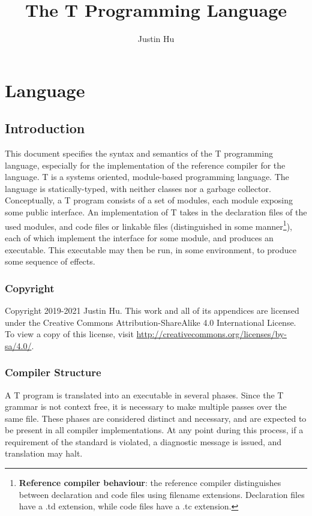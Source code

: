 \documentclass[letterpaper,12pt]{book}
\begin{document}
\title{The T Programming Language}
\author{Justin Hu}
\maketitle
\tableofcontents

\part{Language}

\chapter{Introduction}

This document specifies the syntax and semantics of the T programming language, especially for the implementation of the reference compiler for the language. T is a systems oriented, module-based programming language. The language is statically-typed, with neither classes nor a garbage collector. Conceptually, a T program consists of a set of modules, each module exposing some public interface. An implementation of T takes in the declaration files of the used modules, and code files or linkable files (distinguished in some manner\footnote{\textbf{Reference compiler behaviour}: the reference compiler distinguishes between declaration and code files using filename extensions. Declaration files have a .td extension, while code files have a .tc extension.}), each of which implement the interface for some module, and produces an executable. This executable may then be run, in some environment, to produce some sequence of effects.

\section{Copyright}

Copyright 2019-2021 Justin Hu. This work and all of its appendices are licensed under the Creative Commons Attribution-ShareAlike 4.0 International License. To view a copy of this license, visit \url{http://creativecommons.org/licenses/by-sa/4.0/}.

\section{Compiler Structure}

A T program is translated into an executable in several phases. Since the T grammar is not context free, it is necessary to make multiple passes over the same file. These phases are considered distinct and necessary, and are expected to be present in all compiler implementations. At any point during this process, if a requirement of the standard is violated, a diagnostic message is issued, and translation may halt.
\end{document}
